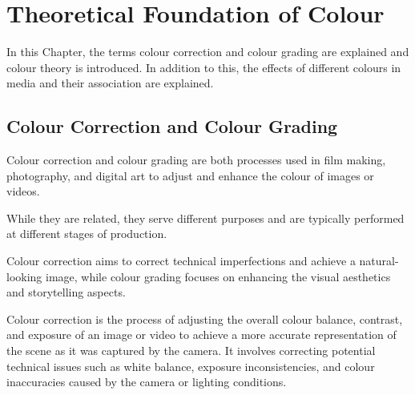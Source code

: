\documentclass[../MasterThesis.tex]{subfiles}
\begin{document}
	

%
%
%
%
%
%
%
%
\newpage

\section{Theoretical Foundation of Colour} \label{section:theoreticalfoundationofcolour}

In this Chapter, the terms colour correction and colour grading are explained and colour theory is introduced. 
In addition to this, the effects of different colours in media and their association are explained.





\subsection{Colour Correction and Colour Grading} 


Colour correction and colour grading are both processes used in film making, photography, and digital art to adjust and enhance the colour of images or videos. 

While they are related, they serve different purposes and are typically performed at different stages of production.

Colour correction aims to correct technical imperfections and achieve a natural-looking image, while colour grading focuses on enhancing the visual aesthetics and storytelling aspects.~\cite{cc_cg_1, cc_cg_2}


Colour correction is the process of adjusting the overall colour balance, contrast, and exposure of an image or video to achieve a more accurate representation of the scene as it was captured by the camera. It involves correcting potential technical issues such as white balance, exposure inconsistencies, and colour inaccuracies caused by the camera or lighting conditions.~\cite{cc1, cc_cg_1, cc_cg_2}
\end{document}
